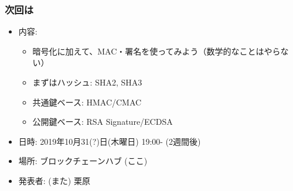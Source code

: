 \documentclass[12pt,dvipdfmx]{beamer}
\newcommand{\backupbegin}{
   \newcounter{framenumberappendix}
   \setcounter{framenumberappendix}{\value{framenumber}}
}
\newcommand{\backupend}{
   \addtocounter{framenumberappendix}{-\value{framenumber}}
   \addtocounter{framenumber}{\value{framenumberappendix}} 
}
\begin{document}
\begin{frame}
\frametitle{次回は}
\begin{itemize}
 \item 内容: 
\begin{itemize}
 \item 暗号化に加えて、MAC・署名を使ってみよう（数学的なことはやらない）
 \item まずはハッシュ: SHA2, SHA3
 \item 共通鍵ベース: HMAC/CMAC
 \item 公開鍵ベース: RSA Signature/ECDSA
\end{itemize}
 \item 日時: 2019年10月31(?)日(木曜日) 19:00- (2週間後)
 \item 場所: ブロックチェーンハブ (ここ)
 \item 発表者: (また) 栗原
\end{itemize}
\end{frame}






















 

\end{document}
